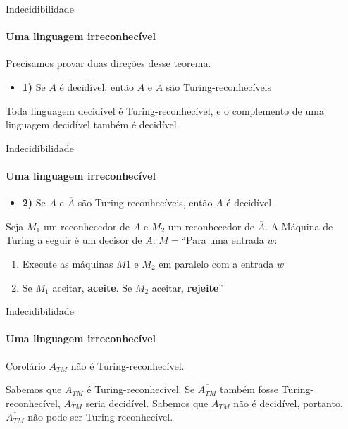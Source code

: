 \documentclass{beamer}
\begin{document}
\begin{frame}{Indecidibilidade}
	\framesubtitle{Uma linguagem irreconhecível}
	Precisamos provar duas direções desse teorema.
	\begin{itemize}
		\item \textbf{1)} Se $A$ é decidível, então $A$ e $\overline{A}$ são Turing-reconhecíveis
	\end{itemize}
	Toda linguagem decidível é Turing-reconhecível, e o complemento de uma linguagem decidível também é decidível.
\end{frame}
\begin{frame}{Indecidibilidade}
	\framesubtitle{Uma linguagem irreconhecível}
	\begin{itemize}
		\item \textbf{2)} Se $A$ e $\overline{A}$ são Turing-reconhecíveis, então $A$ é decidível
	\end{itemize}
	Seja $M_{1}$ um reconhecedor de $A$ e $M_{2}$ um reconhecedor de $\overline{A}$. A Máquina de Turing a seguir é um decisor de $A$:
	$M = $``Para uma entrada $w$:
	\begin{enumerate}
		\item Execute as máquinas $M{1}$ e $M_{2}$ em paralelo com a entrada $w$
		\item Se $M_{1}$ aceitar, \textbf{aceite}. Se $M_{2}$ aceitar, \textbf{rejeite}''
	\end{enumerate}
\end{frame}
\begin{frame}{Indecidibilidade}
	\framesubtitle{Uma linguagem irreconhecível}
	\begin{block}{Corolário}
		$\overline{A_{TM}}$ não é Turing-reconhecível.
	\end{block}
	
	Sabemos que $A_{TM}$ é Turing-reconhecível. Se $\overline{A_{TM}}$ também fosse Turing-reconhecível, $A_{TM}$ seria decidível. Sabemos que $A_{TM}$ não é decidível, portanto, $\overline{A_{TM}}$ não pode ser Turing-reconhecível.
\end{frame}
\end{document}
